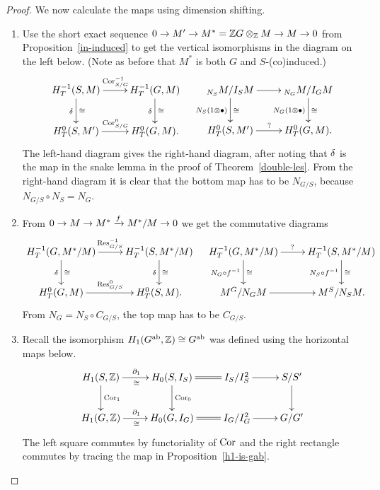 \begin{proof}
We now calculate the maps using dimension shifting.
\begin{enumerate}
\item Use the short exact sequence $0\to M'\to M^*=\mathbb{Z} G\otimes_{\mathbb{Z}} M\to M\to 0$ from Proposition~\ref{in-induced} to get the vertical isomorphisms in the diagram on the left below. (Note as before that $M^*$ is both $G$ and $S$-(co)induced.)
\[
\xymatrix{
H_T^{-1}(S,M)\ar[d]^{\cong}_{\de}\ar[r]^{\Cor_{S/G}^{-1}} &
H_T^{-1}(G,M)\ar[d]^{\cong}_{\de}\\
H_T^0(S,M')\ar[r]^{\Cor_{S/G}^0} & H_T^0(G,M).
}\quad 
\xymatrix{
{}_{N_S}M/I_SM\ar[d]^{\cong}_{N_S( 1\ot \bullet)}\ar[r] &
{}_{N_G}M/I_GM\ar[d]^{\cong}_{N_G( 1\ot \bullet)}\\
H_T^0(S,M')\ar[r]^{?} & H_T^0(G,M).
}
\]
The left-hand diagram gives the right-hand diagram, after noting that $\delta$ is the map in the snake lemma in the proof of Theorem~\ref{double-les}. From the right-hand diagram it is clear that the bottom map has to be $N_{G/S}$, because $N_{G/S}\circ N_S=N_G$.
\item
From $0\to M\to M^*\xrightarrow{f} M^*/M\to 0$ we get the commutative diagrams
\[
\xymatrix{
H_T^{-1}(G,M^*/M)\ar[d]^{\cong}_{\de}\ar[r]^{\Res_{G/S}^{-1}} &
H_T^{-1}(S,M^*/M)\ar[d]^{\cong}_{\de}\\
H_T^0(G,M)\ar[r]^{\Res_{G/S}^0} & H_T^0(S,M).
}\quad 
\xymatrix{
H_T^{-1}(G,M^*/M)\ar[d]^{\cong}_{N_{G}\circ f^{-1}}\ar[r]^{?} &
H_T^{-1}(S,M^*/M)\ar[d]^{\cong}_{N_S\circ f^{-1}}\\
M^G/N_GM\ar[r] & M^S/N_SM.
}
\]
From $N_G=N_S\circ C_{G/S}$, the top map has to be $C_{G/S}$. %
\item
Recall the isomorphism $H_1(G^{\text{ab}},\mathbb{Z})\cong G^{\text{ab}}$ was defined using the horizontal maps below.
\[
\xymatrix{
H_1(S,\Z) \ar[d]^{\Cor_1} \ar[r]^{\partial_1}_{\cong} & H_0(S,I_S)\ar@{=}[r]\ar[d]^{\Cor_0} & I_S/I_S^2 \ar[r] & S/S'\ar[d]\\
H_1(G,\Z) \ar[r]^{\partial_1}_{\cong} & H_0(G,I_G)\ar@{=}[r] & I_G/I_G^2 \ar[r] & G/G'
}
\]
The left square commutes by functoriality of $\operatorname{Cor}$ and the right rectangle commutes by tracing the map in Proposition~\ref{h1-is-gab}.\qedhere
\end{enumerate}
\end{proof}
